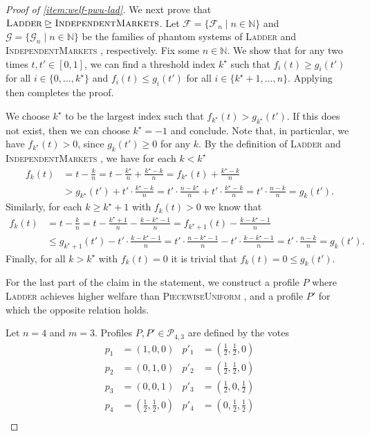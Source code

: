 \documentclass[11pt]{article}
\newcommand{\F}{\mathcal{F}}
\newcommand{\G}{\mathcal{G}}
\newcommand{\N}{\mathbb{N}}
\newcommand{\IM}{\textsc{IndependentMarkets} }
\newcommand{\Ladder}{\textsc{Ladder} }
\newcommand{\PiecewiseUniform}{\textsc{PiecewiseUniform} }
\begin{document}
\begin{proof}[Proof of  \textnormal{\ref{item:welf-pwu-lad}}]
    We next prove that $\Ladder \trianglerighteq \IM$.
    Let $\F = \{\F_n \mid n \in \N\}$ and $\G = \{\G_n \mid n \in \N\}$ be the families of phantom systems of \Ladder and \IM, respectively. Fix some $n \in \N$. We show that for any two times $t, t' \in [0,1]$, we can find a threshold index $k^\star$ such that $f_i(t) \ge g_i(t')$ for all $i \in \{0, \dots, k^\star\}$ and $f_i(t) \le g_i(t')$ for all $i \in \{k^\star+1, \dots, n\}$. Applying  then completes the proof.

    We choose $k^\star$ to be the largest index such that $f_{k^\star}(t) > g_{k^\star}(t')$. If this does not exist, then we can choose $k^\star = -1$ and conclude. Note that, in particular, we have $f_{k^\star}(t) > 0$, since $g_k(t') \ge 0$ for any $k$. By the definition of \Ladder and \IM, we have for each $k < k^\star$
    \begin{align*}
        f_{k}(t) &= t - \frac{k}{n} = t - \frac{k^\star}{n} + \frac{k^\star-k}{n} = f_{k^\star}(t) + \frac{k^\star-k}{n} \\
        &> g_{k^\star}(t') + t' \cdot \frac{k^\star-k}{n} = t' \cdot \frac{n-k^\star}{n} + t' \cdot \frac{k^\star-k}{n} = t' \cdot \frac{n-k}{n} = g_{k}(t').
    \end{align*}
    Similarly, for each $k \ge k^\star+1$ with $f_k(t) > 0$ we know that 
    \begin{align*}
        f_{k}(t) &= t-\frac{k}{n} = t - \frac{k^\star+1}{n} - \frac{k-k^\star-1}{n} = f_{k^\star+1}(t) - \frac{k-k^\star-1}{n}  \\
        &\le g_{k^\star+1}(t') - t' \cdot \frac{k-k^\star-1}{n} = t' \cdot \frac{n-k^\star-1}{n} - t' \cdot \frac{k-k^\star-1}{n} = t'\cdot \frac{n-k}{n} = g_{k}(t').
    \end{align*}
    Finally, for all $k > k^\star$ with $f_k(t) = 0$ it is trivial that $f_{k}(t) = 0 \le g_{k}(t')$.

    For the last part of the claim in the statement, we construct a profile $P$ where \Ladder achieves higher welfare than \PiecewiseUniform, and a profile $P'$ for which the opposite relation holds.

    Let $n = 4$ and $m = 3$.
    Profiles $P, P' \in \mathcal{P}_{4,3}$ are defined by the votes
    \begin{align*} 
        p_1 &= (1, 0, 0)         & p'_1 &= (\textstyle\frac{1}{2}, \textstyle\frac{1}{2}, 0) \\
        p_2 &= (0, 1, 0)         & p'_2 &= (\textstyle\frac{1}{2}, \textstyle\frac{1}{2}, 0)  \\
        p_3 &= (0, 0, 1)         & p'_3 &= (\textstyle\frac{1}{2}, 0, \textstyle\frac{1}{2}) \\
        p_4 &= (\textstyle\frac{1}{2}, \textstyle\frac{1}{2}, 0)         & p'_4 &= (0, \textstyle\frac{1}{2}, \textstyle\frac{1}{2}) \\
    \end{align*}
    

\end{proof}
\end{document}
